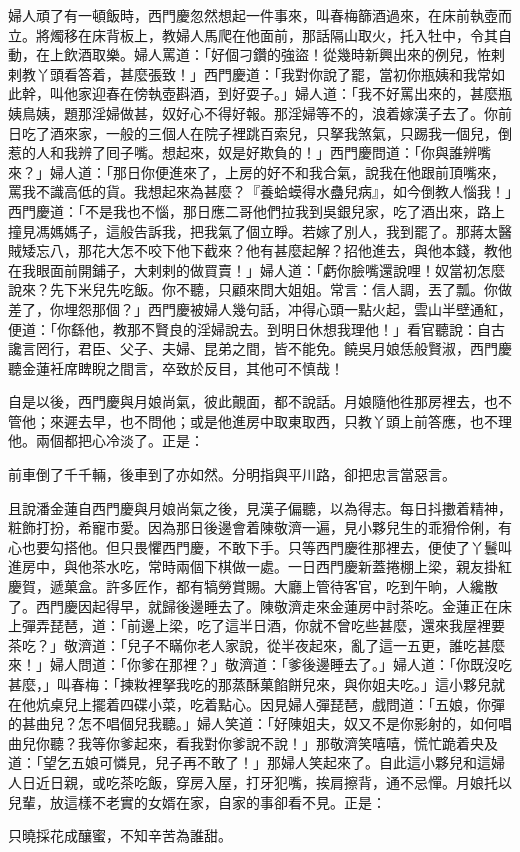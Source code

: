 婦人頑了有一頓飯時，西門慶忽然想起一件事來，叫春梅篩酒過來，在床前執壺而立。將燭移在床背板上，教婦人馬爬在他面前，那話隔山取火，托入牡中，令其自動，在上飲酒取樂。婦人罵道：「好個刁鑽的強盜！從幾時新興出來的例兒，恠剌剌教丫頭看答着，甚麼張致！」西門慶道：「我對你說了罷，當初你瓶姨和我常如此幹，叫他家迎春在傍執壺斟酒，到好耍子。」婦人道：「我不好罵出來的，甚麼瓶姨鳥姨，題那淫婦做甚，奴好心不得好報。那淫婦等不的，浪着嫁漢子去了。你前日吃了酒來家，一般的三個人在院子裡跳百索兒，只拏我煞氣，只踢我一個兒，倒惹的人和我辨了囘子嘴。想起來，奴是好欺負的！」西門慶問道：「你與誰辨嘴來？」婦人道：「那日你便進來了，上房的好不和我合氣，說我在他跟前頂嘴來，罵我不識高低的貨。我想起來為甚麼？『養蛤蟆得水蠱兒病』，如今倒教人惱我！」西門慶道：「不是我也不惱，那日應二哥他們拉我到吳銀兒家，吃了酒出來，路上撞見馮媽媽子，這般告訴我，把我氣了個立睜。若嫁了別人，我到罷了。那蔣太醫賊矮忘八，那花大怎不咬下他下截來？{}他有甚麼起解？招他進去，與他本錢，教他在我眼面前開鋪子，大剌剌的做買賣！」婦人道：「虧你臉嘴還說哩！{}奴當初怎麼說來？先下米兒先吃飯。你不聽，只顧來問大姐姐。常言：信人調，丟了瓢。你做差了，你埋怨那個？」西門慶被婦人幾句話，冲得心頭一點火起，雲山半壁通紅，便道：「你繇他，教那不賢良的淫婦說去。到明日休想我理他！」看官聽說：自古讒言罔行，君臣、父子、夫婦、昆弟之間，皆不能免。饒吳月娘恁般賢淑，西門慶聽金蓮衽席睥睨之間言，卒致於反目，其他可不慎哉！

自是以後，西門慶與月娘尚氣，彼此覿面，都不說話。月娘隨他徃那房裡去，也不管他；來遲去早，也不問他；或是他進房中取東取西，只教丫頭上前答應，也不理他。兩個都把心冷淡了。正是：

前車倒了千千輛，後車到了亦如然。分明指與平川路，卻把忠言當惡言。

且說潘金蓮自西門慶與月娘尚氣之後，見漢子偏聽，以為得志。每日抖擻着精神，粧飾打扮，希寵市愛。因為那日後邊會着陳敬濟一遍，見小夥兒生的乖猾伶俐，有心也要勾搭他。但只畏懼西門慶，不敢下手。只等西門慶徃那裡去，便使了丫鬟叫進房中，與他茶水吃，常時兩個下棋做一處。一日西門慶新蓋捲棚上梁，親友掛紅慶賀，遞菓盒。許多匠作，都有犒勞賞賜。大廳上管待客官，吃到午晌，人纔散了。西門慶因起得早，就歸後邊睡去了。陳敬濟走來金蓮房中討茶吃。金蓮正在床上彈弄琵琶，道：「前邊上梁，吃了這半日酒，你就不曾吃些甚麼，還來我屋裡要茶吃？」敬濟道：「兒子不瞞你老人家說，從半夜起來，亂了這一五更，誰吃甚麼來！」婦人問道：「你爹在那裡？」{}敬濟道：「爹後邊睡去了。」婦人道：「你既沒吃甚麼，」叫春梅：「揀籹裡拏我吃的那蒸酥菓餡餅兒來，與你姐夫吃。」這小夥兒就在他炕桌兒上擺着四碟小菜，吃着點心。因見婦人彈琵琶，戲問道：「五娘，你彈的甚曲兒？怎不唱個兒我聽。」婦人笑道：「好陳姐夫，奴又不是你影射的，{}如何唱曲兒你聽？我等你爹起來，看我對你爹說不說！」那敬濟笑嘻嘻，慌忙跪着央及道：「望乞五娘可憐見，兒子再不敢了！」{}那婦人笑起來了。自此這小夥兒和這婦人日近日親，或吃茶吃飯，穿房入屋，打牙犯嘴，挨肩擦背，通不忌憚。月娘托以兒輩，放這樣不老實的女婿在家，自家的事卻看不見。正是：

只曉採花成釀蜜，不知辛苦為誰甜。


